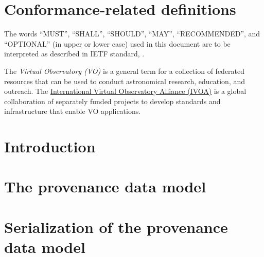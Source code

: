 \documentclass[11pt,a4paper]{ivoa}
\begin{document}
\section*{Conformance-related definitions}

The words ``MUST'', ``SHALL'', ``SHOULD'', ``MAY'', ``RECOMMENDED'', and
``OPTIONAL'' (in upper or lower case) used in this document are to be
interpreted as described in IETF standard, \citet{std:RFC2119}.

The \emph{Virtual Observatory (VO)} is
a general term for a collection of federated resources that can be used
to conduct astronomical research, education, and outreach.
The \href{http://www.ivoa.net}{International
Virtual Observatory Alliance (IVOA)} is a global
collaboration of separately funded projects to develop standards and
infrastructure that enable VO applications.


\section{Introduction}






\section{The provenance data model}
\label{sec:datamodel}





\clearpage
\section{Serialization of the provenance data model}
\label{sec:serialisations}

%
\end{document}
